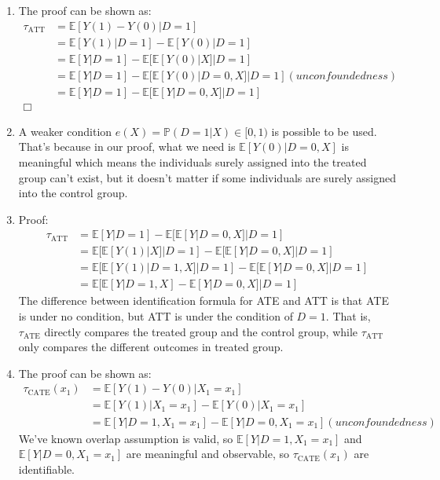 \documentclass{notes}
\begin{document}
	\begin{enumerate}[label=\textbf{(\alph*)}]
		\item The proof can be shown as:
		\begin{equation}
			\begin{aligned}
				\tau_{\mathrm{ATT}} &= \mathbb{E}[Y(1)-Y(0)|D=1] \\
				&= \mathbb{E}[Y(1)|D=1]-\mathbb{E}[Y(0)|D=1] \\
				&= \mathbb{E}[Y|D=1]-\mathbb{E}[\mathbb{E}[Y(0)|X]|D=1] \\
				&= \mathbb{E}[Y|D=1]-\mathbb{E}[\mathbb{E}[Y(0)|D=0,X]|D=1](unconfoundedness) \\
				&= \mathbb{E}[Y|D=1]-\mathbb{E}[\mathbb{E}[Y|D=0,X]|D=1] \\
				\Box
			\end{aligned}
		\end{equation}
		\item A weaker condition $e(X)=\mathbb{P}(D=1|X)\in [0,1)$ is possible to be used. That's because in our proof, what we need is $\mathbb{E}[Y(0)|D=0,X]$ is meaningful which means the individuals surely assigned into the treated group can't exist, but it doesn't matter if some individuals are surely assigned into the control group.
		\item Proof:
		\begin{align*}
			\tau_{\mathrm{ATT}} &= \mathbb{E}[Y|D=1]-\mathbb{E}[\mathbb{E}[Y|D=0,X]|D=1] \\
			&= \mathbb{E}[\mathbb{E}[Y(1)|X]|D=1]-\mathbb{E}[\mathbb{E}[Y|D=0,X]|D=1] \\
			&= \mathbb{E}[\mathbb{E}[Y(1)|D=1,X]|D=1]-\mathbb{E}[\mathbb{E}[Y|D=0,X]|D=1] \\
			&= \mathbb{E}[\mathbb{E}[Y|D=1,X]-\mathbb{E}[Y|D=0,X]|D=1]
		\end{align*}
		 The difference between identification formula for ATE and ATT is that ATE is under no condition, but ATT is under the condition of $D=1$. That is, $\tau_{\mathrm{ATE}}$ directly compares the treated group and the control group, while $\tau_{\mathrm{ATT}}$ only compares the different outcomes in treated group.
		\item The proof can be shown as:
		\begin{align*}
			\tau_{\mathrm{CATE}}(x_1) &= \mathbb{E}[Y(1)-Y(0)|X_1=x_1] \\
			&= \mathbb{E}[Y(1)|X_1=x_1] - \mathbb{E}[Y(0)|X_1=x_1] \\
			&= \mathbb{E}[Y|D=1,X_1=x_1] - \mathbb{E}[Y|D=0,X_1=x_1] (unconfoundedness)
		\end{align*}
		We've known overlap assumption is valid, so $\mathbb{E}[Y|D=1,X_1=x_1]$ and $\mathbb{E}[Y|D=0,X_1=x_1]$ are meaningful and observable, so $\tau_{\mathrm{CATE}}(x_1)$ are identifiable.
	\end{enumerate}
\end{document}
